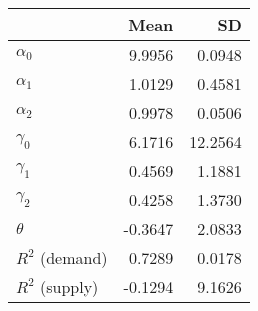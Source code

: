 
\begin{tabular}[t]{lrr}
\toprule
  & Mean & SD\\
\midrule
$\alpha_{0}$ & 9.9956 & 0.0948\\
$\alpha_{1}$ & 1.0129 & 0.4581\\
$\alpha_{2}$ & 0.9978 & 0.0506\\
$\gamma_{0}$ & 6.1716 & 12.2564\\
$\gamma_{1}$ & 0.4569 & 1.1881\\
$\gamma_{2}$ & 0.4258 & 1.3730\\
$\theta$ & -0.3647 & 2.0833\\
$R^{2}$ (demand) & 0.7289 & 0.0178\\
$R^{2}$ (supply) & -0.1294 & 9.1626\\
\bottomrule
\end{tabular}
